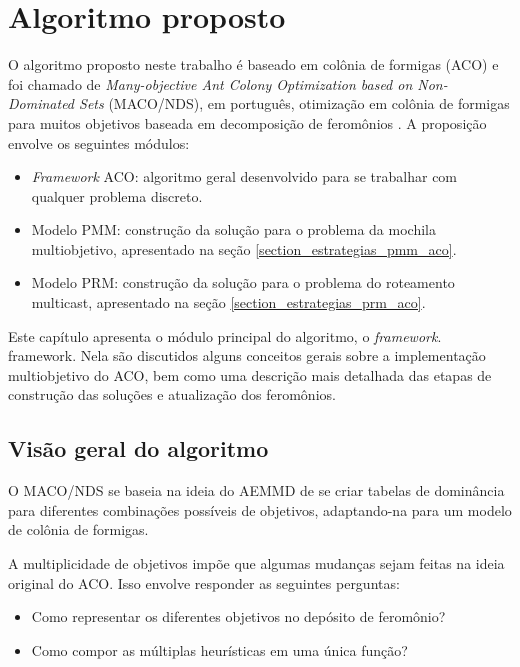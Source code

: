 \chapter[Algoritmo proposto]{Algoritmo proposto}
\label{chapter_macod}

O algoritmo proposto neste trabalho é baseado em colônia de formigas (ACO) e foi chamado de \textit{Many-objective Ant Colony Optimization based on Non-Dominated Sets} (MACO/NDS), em português, otimização em colônia de formigas para muitos objetivos baseada em decomposição de feromônios \cite{Franca2018}. A proposição envolve os seguintes módulos:

\begin{itemize}
	\item \textit{Framework} ACO: algoritmo geral desenvolvido para se trabalhar com qualquer problema discreto.
	\item Modelo PMM: construção da solução para o problema da mochila multiobjetivo, apresentado na seção \ref{section_estrategias_pmm_aco}.
	\item Modelo PRM: construção da solução para o problema do roteamento multicast, apresentado na seção \ref{section_estrategias_prm_aco}.
\end{itemize}

Este capítulo apresenta o módulo principal do algoritmo, o \textit{framework}. framework. Nela são discutidos alguns conceitos gerais sobre a implementação multiobjetivo do ACO, bem como uma descrição mais detalhada das etapas de construção das soluções e atualização dos feromônios.

\section{Visão geral do algoritmo}

O MACO/NDS se baseia na ideia do AEMMD de se criar tabelas de dominância para diferentes combinações possíveis de objetivos, adaptando-na para um modelo de colônia de formigas.

A multiplicidade de objetivos impõe que algumas mudanças sejam feitas na ideia original do ACO. Isso envolve responder as seguintes perguntas:

\begin{itemize}
	\item Como representar os diferentes objetivos no depósito de feromônio?
	\item Como compor as múltiplas heurísticas em uma única função?
\end{itemize}

